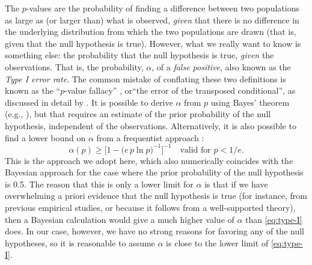 The \(p\)-values are the probability of finding a difference between
two populations as large as (or larger than) what is observed,
\emph{given} that there is no difference in the underlying
distribution from which the two populations are drawn (that is, given
that the null hypothesis is true).  However, what we really want to
know is something else: the probability that the null hypothesis is
true, \emph{given} the observations.  That is, the probability,
\(\alpha\), of a \textit{false positive}, also known as the \textit{Type I
  error rate}.  The common mistake of conflating these two definitions
is known as the ``\(p\)-value fallacy'' \citep{Goodman:1999a}, or``the
error of the transposed conditional'', as discussed in detail by
\citet{Colquhoun:2014a}.  It is possible to derive \(\alpha\) from
\(p\) using Bayes' theorem (e.g., \citealp{Goodman:1999b}), but that
requires an estimate of the prior probability of the null hypothesis,
independent of the observations.  Alternatively, it is also possible
to find a lower bound on \(\alpha\) from a frequentist approach
\citep{Sellke:2001a}:
\begin{equation}
  \label{eq:type-I}
  \alpha(p) \ge \bigg[ 1 - \big(e\, p \ln p\big)^{-1} \bigg]^{-1}
  \quad \text{valid for } p < 1/e.
\end{equation}
This is the approach we adopt here, which also numerically coincides
with the Bayesian approach for the case where the prior probability of
the null hypothesis is 0.5.  The reason that this is only a lower
limit for \(\alpha\) is that if we have overwhelming a priori evidence that
the null hypothesis is true (for instance, from previous empirical
studies, or because it follows from a well-supported theory), then a
Bayesian calculation would give a much higher value of \(\alpha\) than
\eqref{eq:type-I} does.  In our case, however, we have no strong
reasons for favoring any of the null hypotheses, so it is reasonable
to assume \(\alpha\) is close to the lower limit of \eqref{eq:type-I}.

